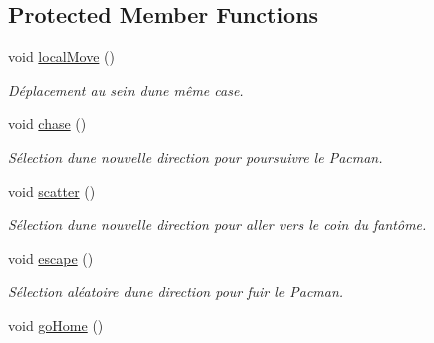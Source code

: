 \subsection*{Protected Member Functions}
\begin{DoxyCompactItemize}
\item 
\hypertarget{class_ghost_a78fa64d27148af69bd45c57e4261f79d}{}void \hyperlink{class_ghost_a78fa64d27148af69bd45c57e4261f79d}{local\+Move} ()\label{class_ghost_a78fa64d27148af69bd45c57e4261f79d}

\begin{DoxyCompactList}\small\item\em Déplacement au sein d\textquotesingle{}une même case. \end{DoxyCompactList}\item 
\hypertarget{class_ghost_acb51421b22f418d0443a24ae82ca169b}{}void \hyperlink{class_ghost_acb51421b22f418d0443a24ae82ca169b}{chase} ()\label{class_ghost_acb51421b22f418d0443a24ae82ca169b}

\begin{DoxyCompactList}\small\item\em Sélection d\textquotesingle{}une nouvelle direction pour poursuivre le Pacman. \end{DoxyCompactList}\item 
\hypertarget{class_ghost_ad713f0afbe29921b18497972debda803}{}void \hyperlink{class_ghost_ad713f0afbe29921b18497972debda803}{scatter} ()\label{class_ghost_ad713f0afbe29921b18497972debda803}

\begin{DoxyCompactList}\small\item\em Sélection d\textquotesingle{}une nouvelle direction pour aller vers le coin du fantôme. \end{DoxyCompactList}\item 
\hypertarget{class_ghost_a22b8e862c12815a2cfe55bd6583c6a08}{}void \hyperlink{class_ghost_a22b8e862c12815a2cfe55bd6583c6a08}{escape} ()\label{class_ghost_a22b8e862c12815a2cfe55bd6583c6a08}

\begin{DoxyCompactList}\small\item\em Sélection aléatoire d\textquotesingle{}une direction pour fuir le Pacman. \end{DoxyCompactList}\item 
\hypertarget{class_ghost_a0c6d41d57edf393eb20f08eb10457914}{}void \hyperlink{class_ghost_a0c6d41d57edf393eb20f08eb10457914}{go\+Home} ()\label{class_ghost_a0c6d41d57edf393eb20f08eb10457914}


\end{DoxyCompactItemize}
